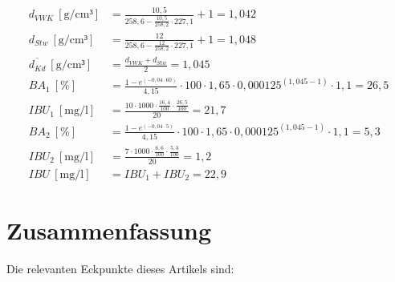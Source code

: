 \documentclass[a4paper,parskip=half]{scrartcl}
\newcommand{\BA}{\mathit{BA}}
\newcommand{\IBU}{\mathit{IBU}}
\newcommand{\uden}{\:[\text{g/cm³}]}
\newcommand{\uper}{\:[\text{\%}]}
\newcommand{\ucon}{\:[\text{mg/l}]}
\begin{document}
\begin{align*}
d_{VWK} \uden &= \frac{10,5}{258,6 - \frac{10,5}{258,2} \cdot 227,1} + 1 = 1,042 \\
d_{Stw} \uden &= \frac{12}{258,6 - \frac{12}{258,2} \cdot 227,1} + 1 = 1,048 \\
\overline{d_{\mathit{Kd}}} \uden &= \frac{d_{VWK} + d_{Stw}}{2} = 1,045 \\
\BA_{1} \uper &= \frac{1 - e^{\left(-0,04 \cdot 60 \right)}}{4,15} \cdot 100 \cdot 1,65 \cdot 0,000125^{\left(1,045 - 1 \right)} \cdot 1,1 = 26,5 \\
\IBU_{1} \ucon &= \frac{10 \cdot 1000 \cdot \frac{16,4}{100} \cdot \frac{26,5}{100}}{20} = 21,7 \\
\BA_{2} \uper &= \frac{1 - e^{\left(-0,04 \cdot 5 \right)}}{4,15} \cdot 100 \cdot 1,65 \cdot 0,000125^{\left(1,045 - 1 \right)} \cdot 1,1 = 5,3 \\
\IBU_{2} \ucon &= \frac{7 \cdot 1000 \cdot \frac{6,6}{100} \cdot \frac{5,3}{100}}{20} = 1,2 \\
\IBU \ucon &= \IBU_{1} + \IBU_{2} = 22,9
\end{align*}



\section*{Zusammenfassung}

Die relevanten Eckpunkte dieses Artikels sind:
\end{document}
